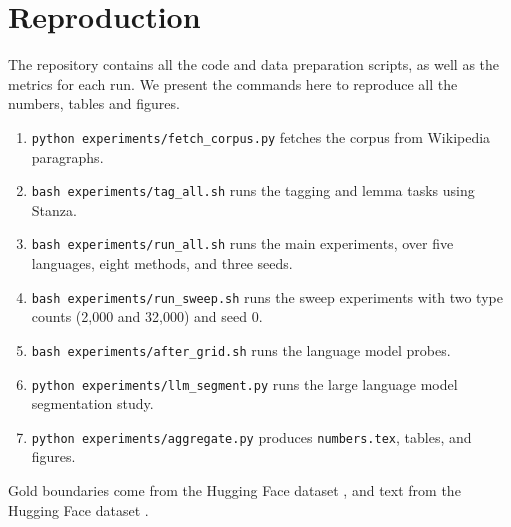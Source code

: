 \section{Reproduction}\label{app:repro}
The repository contains all the code and data preparation scripts, as well as the metrics for each run.
We present the commands here to reproduce all the numbers, tables and figures.
\begin{enumerate}
\item \texttt{python experiments/fetch\_corpus.py} fetches the corpus from Wikipedia paragraphs.
\item \texttt{bash experiments/tag\_all.sh} runs the tagging and lemma tasks using Stanza.
\item \texttt{bash experiments/run\_all.sh} runs the main experiments, over five languages, eight methods, and three seeds.
\item \texttt{bash experiments/run\_sweep.sh} runs the sweep experiments with two type counts (2,000 and 32,000) and seed 0.
\item \texttt{bash experiments/after\_grid.sh} runs the language model probes.
\item \texttt{python experiments/llm\_segment.py} runs the large language model segmentation study.
\item \texttt{python experiments/aggregate.py} produces \texttt{numbers.tex}, tables, and figures.
\end{enumerate}
Gold boundaries come from the Hugging Face dataset , and text from the Hugging Face dataset .
